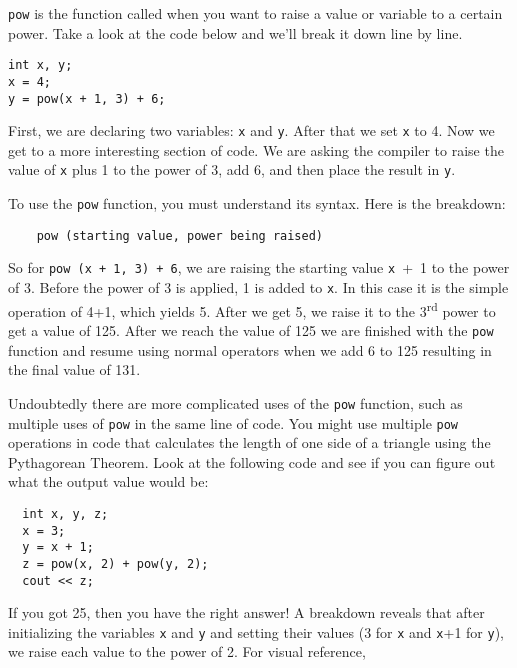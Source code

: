 
	\texttt{pow} is the function called when you want to raise a value or 
variable to a certain power. Take a look at the code below and 
we'll break it down line by line.

\begin{lstlisting}
int x, y;
x = 4;
y = pow(x + 1, 3) + 6;
\end{lstlisting}

	First, we are declaring two variables: \texttt{x} and \texttt{y}. 
	After that we set \texttt{x} to 4. 
	Now we get to a more interesting section of code. 
	We are asking the compiler to raise the value of \texttt{x} plus 1 to the power of 3, add 6, and then place the result in \texttt{y}. 
	
	To use the \texttt{pow} function, you must understand its syntax. 
	Here is the breakdown:

\begin{lstlisting}
	pow (starting value, power being raised)
\end{lstlisting}

 	So for \texttt{pow (x + 1, 3) + 6}, we are raising the starting value 
\texttt{x}~+~1 to the power of 3. 
 	Before the power of 3 is applied, 1 is added to \texttt{x}. 
 	In this case it is the simple operation of 4+1, which yields 5. 
 	After we get 5, we raise it to the 3\textsuperscript{rd} power to get a value of 125. 
 	After we reach the value of 125 we are finished with the \texttt{pow} 
function and resume using normal operators when we add 6 to 125 resulting in 
the final value of 131.  
	

	Undoubtedly there are more complicated uses of the \texttt{pow} function, such as multiple uses of \texttt{pow} in the same line of code. 
	You might use multiple \texttt{pow} operations in code that calculates the length of one side of a triangle using the Pythagorean Theorem. 
	Look at the following code and see if you can figure out what the output value would be:

\begin{lstlisting}
  int x, y, z;
  x = 3;
  y = x + 1;
  z = pow(x, 2) + pow(y, 2);
  cout << z;
\end{lstlisting}

	If you got 25, then you have the right answer! 
	A breakdown reveals that after initializing the variables \texttt{x} and \texttt{y} and setting their values (3 for \texttt{x} and \texttt{x}+1 for \texttt{y}), we raise each value to the power of 2. 
	For visual reference,

